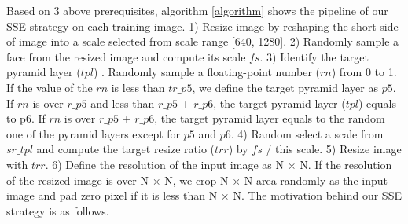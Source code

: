 \documentclass[10pt,twocolumn,letterpaper]{article}
\begin{document}
Based on 3 above prerequisites, algorithm \ref{algorithm} shows the pipeline of our SSE strategy on each training image. 1) Resize image by reshaping  the  short  side  of  image into a scale selected from scale range [640, 1280].  2) Randomly sample a face from the resized image and compute its scale $fs$. 3) Identify the target pyramid layer ($tpl$) . Randomly sample a floating-point number ($rn$)  from 0 to 1. If the value of the $rn$ is less than $tr\_p5$, we define the target pyramid layer  as $p5$. If $rn$ is over $r\_p5$ and less than $r\_p5$ + $r\_p6$,  the target pyramid layer ($tpl$) equals to p6. If  $rn$ is over  $r\_p5$ + $r\_p6$,  the target pyramid layer equals to
the random one of the pyramid layers except for $p5$ and $p6$. 4) Random select a scale from $sr\_tpl$ and compute the target resize ratio ($trr$) by $fs$ / this scale. 
5) Resize image with $trr$. 6) Define the resolution of the input image as N $\times$ N. If the resolution of the resized image is over N $\times$ N, we crop N $\times$ N area randomly as the input image and pad zero pixel if it is less than N $\times$ N.
The motivation behind our SSE strategy is as follows.
\end{document}
